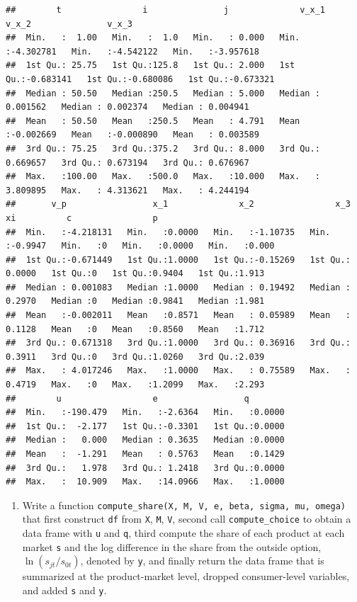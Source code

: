 \documentclass[
]{book}
\providecommand{\tightlist}{%
  \setlength{\itemsep}{0pt}\setlength{\parskip}{0pt}}
\begin{document}
\begin{verbatim}
##        t                i               j              v_x_1               v_x_2               v_x_3          
##  Min.   :  1.00   Min.   :  1.0   Min.   : 0.000   Min.   :-4.302781   Min.   :-4.542122   Min.   :-3.957618  
##  1st Qu.: 25.75   1st Qu.:125.8   1st Qu.: 2.000   1st Qu.:-0.683141   1st Qu.:-0.680086   1st Qu.:-0.673321  
##  Median : 50.50   Median :250.5   Median : 5.000   Median : 0.001562   Median : 0.002374   Median : 0.004941  
##  Mean   : 50.50   Mean   :250.5   Mean   : 4.791   Mean   :-0.002669   Mean   :-0.000890   Mean   : 0.003589  
##  3rd Qu.: 75.25   3rd Qu.:375.2   3rd Qu.: 8.000   3rd Qu.: 0.669657   3rd Qu.: 0.673194   3rd Qu.: 0.676967  
##  Max.   :100.00   Max.   :500.0   Max.   :10.000   Max.   : 3.809895   Max.   : 4.313621   Max.   : 4.244194  
##       v_p                 x_1              x_2                x_3                xi          c                p        
##  Min.   :-4.218131   Min.   :0.0000   Min.   :-1.10735   Min.   :-0.9947   Min.   :0   Min.   :0.0000   Min.   :0.000  
##  1st Qu.:-0.671449   1st Qu.:1.0000   1st Qu.:-0.15269   1st Qu.: 0.0000   1st Qu.:0   1st Qu.:0.9404   1st Qu.:1.913  
##  Median : 0.001083   Median :1.0000   Median : 0.19492   Median : 0.2970   Median :0   Median :0.9841   Median :1.981  
##  Mean   :-0.002011   Mean   :0.8571   Mean   : 0.05989   Mean   : 0.1128   Mean   :0   Mean   :0.8560   Mean   :1.712  
##  3rd Qu.: 0.671318   3rd Qu.:1.0000   3rd Qu.: 0.36916   3rd Qu.: 0.3911   3rd Qu.:0   3rd Qu.:1.0260   3rd Qu.:2.039  
##  Max.   : 4.017246   Max.   :1.0000   Max.   : 0.75589   Max.   : 0.4719   Max.   :0   Max.   :1.2099   Max.   :2.293  
##        u                  e                 q         
##  Min.   :-190.479   Min.   :-2.6364   Min.   :0.0000  
##  1st Qu.:  -2.177   1st Qu.:-0.3301   1st Qu.:0.0000  
##  Median :   0.000   Median : 0.3635   Median :0.0000  
##  Mean   :  -1.291   Mean   : 0.5763   Mean   :0.1429  
##  3rd Qu.:   1.978   3rd Qu.: 1.2418   3rd Qu.:0.0000  
##  Max.   :  10.909   Max.   :14.0966   Max.   :1.0000
\end{verbatim}

\begin{enumerate}
\def\labelenumi{\arabic{enumi}.}
\setcounter{enumi}{8}
\tightlist
\item
  Write a function \texttt{compute\_share(X,\ M,\ V,\ e,\ beta,\ sigma,\ mu,\ omega)} that first construct \texttt{df} from \texttt{X}, \texttt{M}, \texttt{V}, second call \texttt{compute\_choice} to obtain a data frame with \texttt{u} and \texttt{q}, third compute the share of each product at each market \texttt{s} and the log difference in the share from the outside option, \(\ln(s_{jt}/s_{0t})\), denoted by \texttt{y}, and finally return the data frame that is summarized at the product-market level, dropped consumer-level variables, and added \texttt{s} and \texttt{y}.
\end{enumerate}
\end{document}
